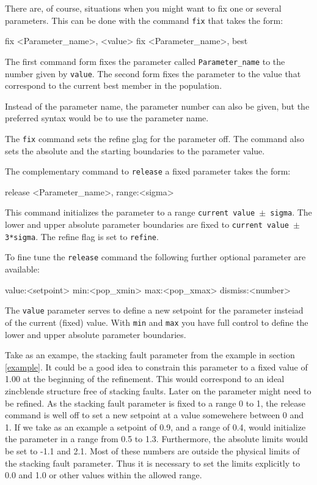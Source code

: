 There are, of course, situations when you might want to fix one or
several parameters. This can be done with the \Diffev command
{\tt fix} that takes the form:

\begin{MacVerbatim}
  fix <Parameter_name>, <value>
  fix <Parameter_name>, best
\end{MacVerbatim}

The first command form fixes the parameter called {\tt Parameter\_name}
to the number given by {\tt value}. The second form  fixes the parameter 
to the value that correspond to the current best member in the population.

Instead of the parameter name, the parameter number can also be given, but
the preferred syntax would be to use the parameter name.

The {\tt fix} command sets the refine glag for the parameter off. The
command also sets the absolute and the starting boundaries to the 
parameter value. 

The complementary command to {\tt release} a fixed parameter takes the 
form:
\begin{MacVerbatim}
  release <Parameter_name>, range:<sigma>
\end{MacVerbatim}

This command initializes the parameter to a range {\tt current value $\pm$ 
sigma}. The lower and upper absolute parameter boundaries are fixed to
{\tt current value $\pm$ 3*sigma}. The refine flag is set to {\tt refine}.

To fine tune the {\tt release} command the following further optional 
parameter are available:
\begin{MacVerbatim}
   value:<setpoint>
   min:<pop_xmin>
   max:<pop_xmax>
   dismiss:<number>
\end{MacVerbatim}

The {\tt value} parameter serves to define a new setpoint for the parameter
insteiad of the current (fixed) value.  With {\tt min} and {\tt max} you 
have full control to define the lower and upper absolute parameter boundaries. 

Take as an exampe, the stacking fault parameter from the example in section
\ref{example}. It could be a good idea to constrain this parameter to a 
fixed value of 1.00 at the beginning of the refinement. This would correspond
to an ideal zincblende structure free of stacking faults. Later on the parameter 
might need to be refined. As the \Discus stacking fault parameter is fixed to a 
range 0 to 1, the release command is well off to set a new setpoint at a value 
somewehere between 0 and 1. If we take as an example a setpoint of 0.9, and a range
of 0.4, \Diffev would initialize the parameter in a range from 0.5 to 1.3. 
Furthermore, the absolute limits would be set to -1.1 and 2.1. Most of these
numbers are outside the physical limits of the \Discus stacking fault parameter.
Thus it is necessary to set the limits explicitly to 0.0 and 1.0 or other
values within the allowed range.

